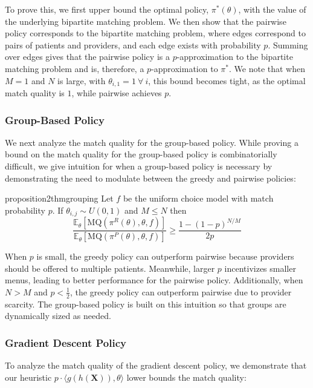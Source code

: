 \documentclass[11pt]{article}
\begin{document}
To prove this, we first upper bound the optimal policy, $\pi^{*}(\theta)$, with the value of the underlying bipartite matching problem. 
We then show that the pairwise policy corresponds to the bipartite matching problem, where edges correspond to pairs of patients and providers, and each edge exists with probability $p$. 
Summing over edges gives that the pairwise policy is a $p$-approximation to the bipartite matching problem and is, therefore, a $p$-approximation to $\pi^{*}$. 
We note that when $M=1$ and $N$ is large, with $\theta_{i,1}=1 \ \forall \ i$, this bound becomes tight, as the optimal match quality is $1$, while pairwise achieves $p$. 

\subsubsection{Group-Based Policy}
We next analyze the match quality for the group-based policy. 
While proving a bound on the match quality for the group-based policy is combinatorially difficult, we give intuition for when a group-based policy is necessary by demonstrating the need to modulate between the greedy and pairwise policies:

\begin{restatable}{proposition2}{thmgrouping}
\label{thm:grouping}
Let $f$ be the uniform choice model with match probability $p$. 
If $\theta_{i,j} \sim U(0,1)$ and $M \leq N$ then
\begin{equation}
    \frac{\mathbb{E}_{\theta}[\mathrm{MQ}(\pi^{R}(\theta),\theta,f)]}{\mathbb{E}_{\theta}[\mathrm{MQ}(\pi^{P}(\theta),\theta,f)]}\geq \frac{1-(1-p)^{N/M}}{2p}
\end{equation}
\end{restatable}

When $p$ is small, the greedy policy can outperform pairwise because providers should be offered to multiple patients.
Meanwhile, larger $p$ incentivizes smaller menus, leading to better performance for the pairwise policy. 
Additionally, when $N>M$ and $p<\frac{1}{2}$, the greedy policy can outperform pairwise due to provider scarcity. 
The group-based policy is built on this intuition so that groups are dynamically sized as needed. 

\subsubsection{Gradient Descent Policy}
\label{sec:gradient_descent_match_quality}
To analyze the match quality of the gradient descent policy, we demonstrate that our heuristic $p \cdot \langle g(h(\mathbf{X})), \theta \rangle$ lower bounds the match quality: 
\end{document}
